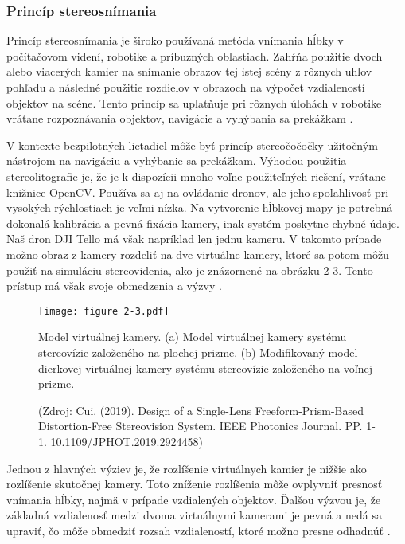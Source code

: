 \subsubsection{Princíp stereosnímania}
Princíp stereosnímania je široko používaná metóda vnímania hĺbky v počítačovom videní, robotike a príbuzných oblastiach. Zahŕňa použitie dvoch alebo viacerých kamier na snímanie obrazov tej istej scény z rôznych uhlov pohľadu a následné použitie rozdielov v obrazoch na výpočet vzdialeností objektov na scéne. Tento princíp sa uplatňuje pri rôznych úlohách v robotike vrátane rozpoznávania objektov, navigácie a vyhýbania sa prekážkam \citep{brzozowski2018stereo}.

V kontexte bezpilotných lietadiel môže byť princíp stereočočočky užitočným nástrojom na navigáciu a vyhýbanie sa prekážkam. Výhodou použitia stereolitografie je, že je k dispozícii mnoho voľne použiteľných riešení, vrátane knižnice OpenCV. Používa sa aj na ovládanie dronov, ale jeho spoľahlivosť pri vysokých rýchlostiach je veľmi nízka. Na vytvorenie hĺbkovej mapy je potrebná dokonalá kalibrácia a pevná fixácia kamery, inak systém poskytne chybné údaje. Naš dron DJI Tello má však napríklad len jednu kameru. V takomto prípade možno obraz z kamery rozdeliť na dve virtuálne kamery, ktoré sa potom môžu použiť na simuláciu stereovidenia, ako je znázornené na obrázku 2-3. Tento prístup má však svoje obmedzenia a výzvy \citep{brzozowski2018stereo}.

\begin{figure}[ht!]
    \centering
    \texttt{[image: figure 2-3.pdf]}
    \caption{Model virtuálnej kamery. (a) Model virtuálnej kamery systému stereovízie založeného na plochej prizme. (b) Modifikovaný model dierkovej virtuálnej kamery systému stereovízie založeného na voľnej prizme.}
    \captionsetup{font=footnotesize, justification=centering, skip=5pt}
    \caption*{(Zdroj: Cui. (2019). Design of a Single-Lens Freeform-Prism-Based Distortion-Free Stereovision System. IEEE Photonics Journal. PP. 1-1. 10.1109/JPHOT.2019.2924458)}
    \label{o:2-3}
\end{figure}

Jednou z hlavných výziev je, že rozlíšenie virtuálnych kamier je nižšie ako rozlíšenie skutočnej kamery. Toto zníženie rozlíšenia môže ovplyvniť presnosť vnímania hĺbky, najmä v prípade vzdialených objektov. Ďalšou výzvou je, že základná vzdialenosť medzi dvoma virtuálnymi kamerami je pevná a nedá sa upraviť, čo môže obmedziť rozsah vzdialeností, ktoré možno presne odhadnúť \citep{cui2019design}.


